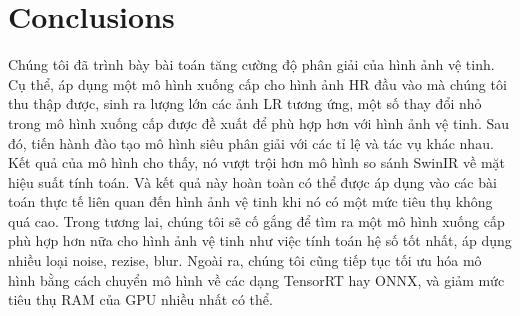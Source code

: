 \documentclass[conference]{IEEEtran}
\begin{document}
\section{Conclusions} \label{sect:conclusion}
Chúng tôi đã trình bày bài toán tăng cường độ phân giải của hình ảnh vệ tinh. Cụ thể, áp dụng một mô hình xuống cấp cho hình ảnh HR đầu vào mà chúng tôi thu thập được, sinh ra lượng lớn các ảnh LR tương ứng, một số thay đổi nhỏ trong mô hình xuống cấp được đề xuất để phù hợp hơn với hình ảnh vệ tinh. Sau đó, tiến hành đào tạo mô hình siêu phân giải với các tỉ lệ và tác vụ khác nhau. Kết quả của mô hình cho thấy, nó vượt trội hơn mô hình so sánh SwinIR về mặt hiệu suất tính toán. Và kết quả này hoàn toàn có thể được áp dụng vào các bài toán thực tế liên quan đến hình ảnh vệ tinh khi nó có một mức tiêu thụ không quá cao. Trong tương lai, chúng tôi sẽ cố gắng để tìm ra một mô hình xuống cấp phù hợp hơn nữa cho hình ảnh vệ tinh như việc tính toán hệ số tốt nhất, áp dụng nhiều loại noise, rezise, blur. Ngoài ra, chúng tôi cũng tiếp tục tối ưu hóa mô hình bằng cách chuyển mô hình về các dạng TensorRT hay ONNX, và giảm mức tiêu thụ RAM của GPU nhiều nhất có thể.


\end{document}
